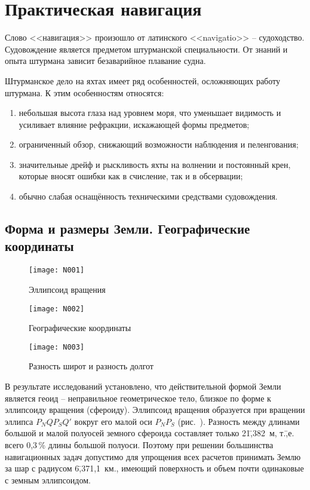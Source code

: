 \chapter{Практическая навигация}\label{chap:6}

Слово <<навигация>> произошло от латинского <<navigatio>> \--- судоходство. Судовождение является предметом штурманской специальности. От знаний и опыта штурмана зависит безаварийное плавание судна.

Штурманское дело на яхтах имеет ряд особенностей, осложняющих работу штурмана. К этим особенностям относятся: 
\begin{enumerate}
\item небольшая высота глаза над уровнем моря, что уменьшает видимость и усиливает влияние рефракции, искажающей формы предметов; 
\item ограниченный обзор, снижающий возможности наблюдения и пеленгования; 
\item значительные дрейф и рыскливость яхты на волнении и постоянный крен, которые вносят ошибки как в счисление, так и в обсервации; 
\item обычно слабая оснащённость техническими средствами судовождения. 
\end{enumerate}

\section{Форма и размеры Земли. Географические координаты} 

\begin{figure}[htb]
  \centering{}
  \texttt{[image: N001]}
  \caption{Эллипсоид вращения}
  \label{fig:N1}
\end{figure}

\begin{figure}[htb]
  \centering{}
  \texttt{[image: N002]}
  \caption{Географические координаты}
  \label{fig:N2}
\end{figure}

\begin{figure*}[htb]
  \centering{}
  \texttt{[image: N003]}
  \caption{Разность широт и разность долгот}
  \label{fig:N3}
\end{figure*}

В результате исследований установлено, что действительной формой Земли является геоид \--- неправильное геометрическое тело, близкое по форме к эллипсоиду вращения (сфероиду). Эллипсоид вращения образуется при вращении эллипса $P_NQP_SQ'$ вокруг его малой оси $P_NP_S$ (рис.~). Разность между длинами большой и малой полуосей земного сфероида составляет только 21\=,382~м, т.\=,е. всего 0,3\,\% длины большой полуоси. Поэтому при решении большинства навигационных задач допустимо для упрощения всех расчетов принимать Землю за шар с радиусом 6\=,371,1~км., имеющий поверхность и объем почти одинаковые с земным эллипсоидом. 

